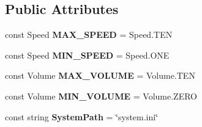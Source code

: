 \subsection*{Public Attributes}
\begin{DoxyCompactItemize}
\item 
const Speed {\bfseries M\+A\+X\+\_\+\+S\+P\+E\+ED} = Speed.\+T\+EN\hypertarget{class_play_data_ad26af255954f87a3e38714c4c52e883b}{}\label{class_play_data_ad26af255954f87a3e38714c4c52e883b}

\item 
const Speed {\bfseries M\+I\+N\+\_\+\+S\+P\+E\+ED} = Speed.\+O\+NE\hypertarget{class_play_data_a59d69a6f1920500d17c31929668d039a}{}\label{class_play_data_a59d69a6f1920500d17c31929668d039a}

\item 
const Volume {\bfseries M\+A\+X\+\_\+\+V\+O\+L\+U\+ME} = Volume.\+T\+EN\hypertarget{class_play_data_ab6ae016cf4a9eb1c28c37405eeb7d2f5}{}\label{class_play_data_ab6ae016cf4a9eb1c28c37405eeb7d2f5}

\item 
const Volume {\bfseries M\+I\+N\+\_\+\+V\+O\+L\+U\+ME} = Volume.\+Z\+E\+RO\hypertarget{class_play_data_a924b81bf46539693eeff9a9776871b09}{}\label{class_play_data_a924b81bf46539693eeff9a9776871b09}

\item 
const string {\bfseries System\+Path} = \char`\"{}system.\+ini\char`\"{}\hypertarget{class_play_data_aec36a92cc8887da39f8152b22419160c}{}\label{class_play_data_aec36a92cc8887da39f8152b22419160c}

\end{DoxyCompactItemize}
